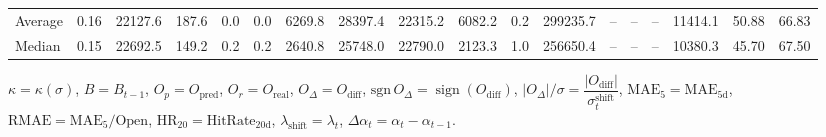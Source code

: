 \begin{threeparttable}
{\begin{tabular}{lrrrrrrrrrrrrrrrrr}
Average &     0.16 & 22127.6 &             187.6 &               0.0 &                0.0 &             6269.8 & 28397.4 & 22315.2 &     6082.2 &                      0.2 &            299235.7 &         -- &        -- &             -- &          11414.1 &           50.88 &                  66.83 \\
 Median &     0.15 & 22692.5 &             149.2 &               0.2 &                0.2 &             2640.8 & 25748.0 & 22790.0 &     2123.3 &                      1.0 &            256650.4 &         -- &        -- &             -- &          10380.3 &           45.70 &                  67.50 \\
\bottomrule
\end{tabular}
}
\begin{tablenotes}\footnotesize
\item $\kappa=\kappa(\sigma)$, $B=B_{t-1}$, $O_p=O_{\text{pred}}$, $O_r=O_{\text{real}}$, $O_\Delta=O_{\text{diff}}$, $\mathrm{sgn}\,O_\Delta=\operatorname{sign}(O_{\text{diff}})$, $|O_\Delta|/\sigma=\dfrac{|O_{\text{diff}}|}{\sigma_t^{\text{shift}}}$, $\mathrm{MAE}_5=\mathrm{MAE}_{5\text{d}}$, $\mathrm{RMAE}= \mathrm{MAE}_5 / \text{Open}$, $\mathrm{HR}_{20}=\mathrm{HitRate}_{20\text{d}}$, 
$\lambda_{\text{shift}}=\lambda_t$, 
$\Delta\alpha_t=\alpha_t-\alpha_{t-1}$.
\end{tablenotes}
\end{threeparttable}
\endgroup


